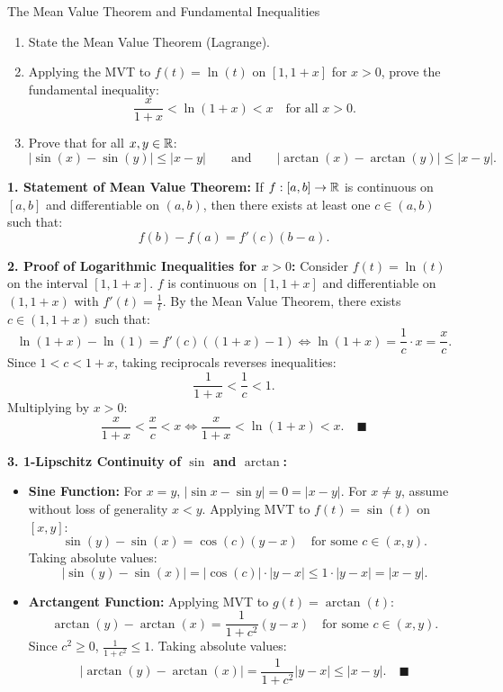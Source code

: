 \begin{exercise}{The Mean Value Theorem and Fundamental Inequalities}
\begin{enumerate}[leftmargin=1.5em,itemsep=2pt]
  \item State the Mean Value Theorem (Lagrange).
  \item Applying the MVT to $f(t) = \ln(t)$ on $[1, 1 + x]$ for $x > 0$, prove the fundamental inequality:
  \[
  \frac{x}{1 + x} < \ln(1 + x) < x \quad \text{for all } x > 0.
  \]
  \item Prove that for all $x, y \in \mathbb{R}$:
  \[
  |\sin(x) - \sin(y)| \le |x - y| \qquad \text{and} \qquad |\arctan(x) - \arctan(y)| \le |x - y|.
  \]
\end{enumerate}
\end{exercise}

\begin{tabletworkspace}[5.0cm]
\end{tabletworkspace}

\begin{solution}
\textbf{1. Statement of Mean Value Theorem:}
If $f: [a, b] \to \mathbb{R}$ is continuous on $[a, b]$ and differentiable on $(a, b)$, then there exists at least one $c \in (a, b)$ such that:
\[
f(b) - f(a) = f'(c)(b - a).
\]

\textbf{2. Proof of Logarithmic Inequalities for $x > 0$:}
Consider $f(t) = \ln(t)$ on the interval $[1, 1 + x]$.
$f$ is continuous on $[1, 1+x]$ and differentiable on $(1, 1+x)$ with $f'(t) = \frac{1}{t}$.
By the Mean Value Theorem, there exists $c \in (1, 1 + x)$ such that:
\[
\ln(1 + x) - \ln(1) = f'(c)((1 + x) - 1) \iff \ln(1 + x) = \frac{1}{c} \cdot x = \frac{x}{c}.
\]
Since $1 < c < 1 + x$, taking reciprocals reverses inequalities:
\[
\frac{1}{1 + x} < \frac{1}{c} < 1.
\]
Multiplying by $x > 0$:
\[
\frac{x}{1 + x} < \frac{x}{c} < x \iff \frac{x}{1 + x} < \ln(1 + x) < x. \quad \blacksquare
\]

\textbf{3. 1-Lipschitz Continuity of $\sin$ and $\arctan$:}
\begin{itemize}[leftmargin=1.5em,itemsep=2pt]
  \item \textbf{Sine Function:} For $x = y$, $|\sin x - \sin y| = 0 = |x - y|$.
  For $x \ne y$, assume without loss of generality $x < y$.
  Applying MVT to $f(t) = \sin(t)$ on $[x, y]$:
  \[
  \sin(y) - \sin(x) = \cos(c)(y - x) \quad \text{for some } c \in (x, y).
  \]
  Taking absolute values:
  \[
  |\sin(y) - \sin(x)| = |\cos(c)| \cdot |y - x| \le 1 \cdot |y - x| = |x - y|.
  \]
  \item \textbf{Arctangent Function:} Applying MVT to $g(t) = \arctan(t)$:
  \[
  \arctan(y) - \arctan(x) = \frac{1}{1 + c^2}(y - x) \quad \text{for some } c \in (x, y).
  \]
  Since $c^2 \ge 0$, $\frac{1}{1 + c^2} \le 1$. Taking absolute values:
  \[
  |\arctan(y) - \arctan(x)| = \frac{1}{1 + c^2}|y - x| \le |x - y|. \quad \blacksquare
  \]
\end{itemize}
\end{solution}

